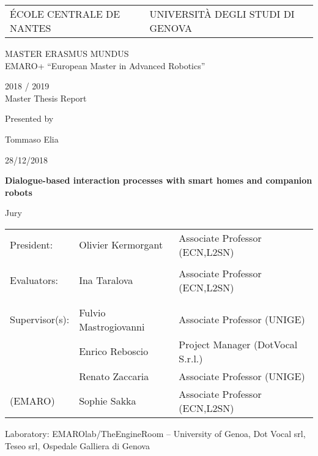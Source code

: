 \thispagestyle{empty}

\def\lskip{\vspace{0.5cm}}


\begin{tabular}{p{7cm}p{10cm}}
ÉCOLE CENTRALE DE NANTES
&
\raggedleft UNIVERSITÀ DEGLI STUDI DI GENOVA	%
\end{tabular}

\vspace{2cm}

\begin{center} \large\sc MASTER ERASMUS MUNDUS \\ \normalsize{EMARO+ ``European Master in Advanced Robotics''} \end{center}


\begin{center}
	2018 / 2019\\
	\lskip
	Master Thesis Report
	\lskip
	
	Presented by \lskip 
	
	Tommaso Elia \lskip
	
	28/12/2018 \lskip\lskip
	
	{\Large \textbf{Dialogue-based interaction processes with smart homes and companion robots}}
	
	\vfill

Jury \lskip
		
	\end{center}
	


\begin{tabular}{p{3cm}p{6cm}p{9cm} }
 President: & Olivier Kermorgant & Associate Professor (ECN,L2SN)  \\ & & \\ 
 Evaluators: & Ina Taralova & Associate Professor (ECN,L2SN) \\
	      & & \\  & & \\ 
  Supervisor(s):  & Fulvio Mastrogiovanni & Associate Professor (UNIGE)\\
		  & Enrico Reboscio & Project Manager (DotVocal S.r.l.) \\
		  & Renato Zaccaria & Associate Professor (UNIGE) \\
(EMARO)  & Sophie Sakka & Associate Professor (ECN,L2SN)
\end{tabular}

\lskip

\begin{flushleft}
 Laboratory:  EMAROlab/TheEngineRoom – University of Genoa, Dot Vocal srl, Teseo srl, Ospedale Galliera di Genova
\end{flushleft}

\newpage
\thispagestyle{empty}
\null
\newpage
\addtocounter{page}{-1}
\pagestyle{fancy}

